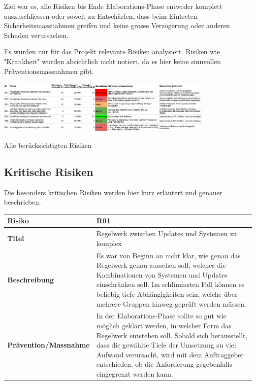 Ziel war es, alle Risiken bis Ende Elaborations-Phase entweder komplett auszuschliessen oder soweit zu Entschärfen, dass beim Eintreten Sicherheitsmassnahmen greifen und keine grosse Verzögerung oder anderen Schaden verursachen.

Es wurden nur für das Projekt relevante Risiken analysiert. Risiken wie "Krankheit" wurden absichtlich nicht notiert, da es hier keine sinnvollen Präventionsmassnahmen gibt.


\begin{landscape}
	\begin{table}[H]
		\centering
		\includegraphics[width=0.8\textwidth,keepaspectratio]{Risikoanalyse.pdf}
		\caption{Alle berücksichtigten Risiken}
		\label{tab:risikoanalyse}
	\end{table}
\end{landscape}

\subsection*{Kritische Risiken}

Die besonders kritischen Risiken werden hier kurz erläutert und genauer beschrieben.

\newcommand{\projectrisk}[4]{
	\begin{tabularx}{\linewidth}{lX}
		\toprule
		\textbf{Risiko} & #1\\
		\midrule
		\textbf{Titel} & #2\\
		\textbf{Beschreibung} & #3\\
		\textbf{Prävention/Massnahme} & #4\\
		\bottomrule
	\end{tabularx}
}


\projectrisk{R01}{Regelwerk zwischen Updates und Systemen zu komplex}
{Es war von Beginn an nicht klar, wie genau das Regelwerk genau aussehen soll, welches die Kombinationen von Systemen und Updates einschränken soll. Im schlimmsten Fall können es beliebig tiefe Abhängigkeiten sein, welche über mehrere Gruppen hinweg geprüft werden müssen.}
{In der Elaborations-Phase sollte so gut wie möglich geklärt werden, in welcher Form das Regelwerk entstehen soll. Sobald sich herausstellt, dass die gewählte Tiefe der Umsetzung zu viel Aufwand verursacht, wird mit dem Auftraggeber entschieden, ob die Anforderung gegebenfalls eingegrenzt werden kann.}


